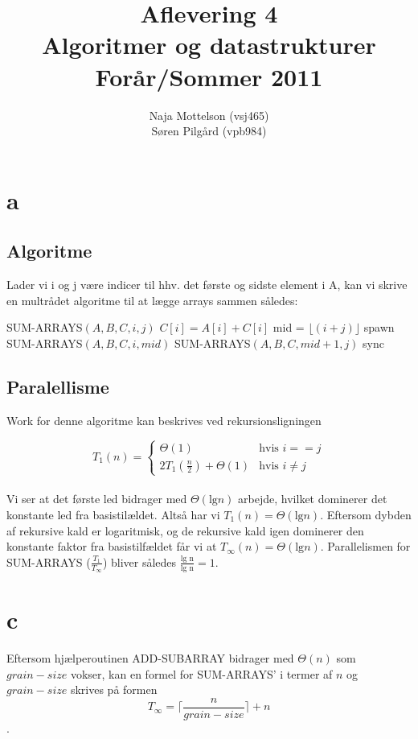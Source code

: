 \documentclass[10pt,a4paper,danish]{article}
\title{Aflevering 4 \\Algoritmer og datastrukturer\\Forår/Sommer 2011}
\author{Naja Mottelson (vsj465)\\Søren Pilgård (vpb984)}
\begin{document}
\maketitle
\newpage

\tableofcontents
\newpage

\section{a}
\subsection{Algoritme}
Lader vi i og j være indicer til hhv. det første og sidste element i A, kan vi
skrive en multrådet algoritme til at lægge arrays sammen således: 
\\

\begin{algorithmic}[1]
\STATE SUM-ARRAYS$(A, B, C, i, j)$
    \STATE $ C[i] = A[i] + C[i]$
\ELSE
    \STATE mid = $\lfloor (i + j) \rfloor$ 
    \STATE spawn SUM-ARRAYS$(A, B, C, i, mid)$
    \STATE SUM-ARRAYS$(A, B, C, mid + 1, j)$
	\STATE sync
\ENDIF
\end{algorithmic}

\subsection{Paralellisme}
Work for denne algoritme kan beskrives ved rekursionsligningen

$$
T_1(n) =
  \begin{cases}
    \Theta(1) & \text{hvis } i == j \\
   2T_1(\frac{n} {2}) + \Theta(1)& \text{hvis } i \neq j
  \end{cases}
$$
\\
Vi ser at det første led bidrager med $\Theta(\text{lg} n)$ arbejde, hvilket
dominerer det konstante led fra basistilældet. Altså har vi $T_1(n) =\Theta(\text{lg} n)$. 
Eftersom dybden af rekursive kald er logaritmisk, og de rekursive kald igen dominerer
den konstante faktor fra basistilfældet får vi at $T_\infty(n) = \Theta(\text{lg} n)$. 
Parallelismen for SUM-ARRAYS ($\frac{T_1} {T_\infty}$) bliver således $\frac{\text{lg n}} {\text{lg n}} = 1$. 

\section{c}
Eftersom hjælperoutinen ADD-SUBARRAY bidrager med $\Theta(n)$ som $grain-size$ vokser, kan en formel for SUM-ARRAYS' i termer af $n$ og $grain-size$ skrives på formen $$T_\infty = \lceil \frac{n} {grain-size} \rceil + n$$. 
\end{document}
